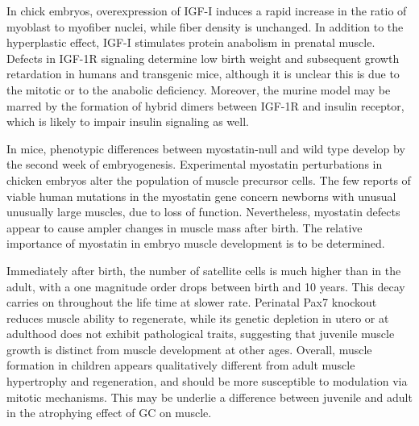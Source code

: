 \documentclass[12pt,english]{report}\usepackage[]{graphicx}\usepackage[]{color}
\begin{document}
In chick embryos, overexpression of IGF-I induces a rapid increase
in the ratio of myoblast to myofiber nuclei, while fiber density is
unchanged\citep{mitchell2002insulin-like}. In addition to the hyperplastic
effect, IGF-I stimulates protein anabolism in prenatal muscle\citep{shen2003protein}.
Defects in IGF-1R signaling determine low birth weight and subsequent
growth retardation in humans and transgenic mice, although it is unclear
this is due to the mitotic or to the anabolic deficiency\citep{fernandez2001functional,abuzzahab2003igf-i}.
Moreover, the murine model may be marred by the formation of hybrid
dimers between IGF-1R and insulin receptor, which is likely to impair
insulin signaling as well.

In mice, phenotypic differences between myostatin-null and wild type
develop by the second week of embryogenesis\citep{matsakas2010altered}.
Experimental myostatin perturbations in chicken embryos alter the
population of muscle precursor cells\citep{manceau2008myostatin}.
The few reports of viable human mutations in the myostatin gene concern
newborns with unusual unusually large muscles, due to loss of function\citep{schuelke2004myostatin}.
Nevertheless, myostatin defects appear to cause ampler changes in
muscle mass after birth\citep{lin2002myostatin,schuelke2004myostatin}.
The relative importance of myostatin in embryo muscle development
is to be determined.

Immediately after birth, the number of satellite cells is much higher
than in the adult, with a one magnitude order drops between birth
and 10 years\citep{verdijk2014satellite}. This decay carries on throughout
the life time at slower rate. Perinatal Pax7 knockout reduces muscle
ability to regenerate, while its genetic depletion in utero or at
adulthood does not exhibit pathological traits\citep{lepper2009adult},
suggesting that juvenile muscle growth is distinct from muscle development
at other ages. Overall, muscle formation in children appears qualitatively
different from adult muscle hypertrophy and regeneration, and should
be more susceptible to modulation via mitotic mechanisms. This may
be underlie a difference between juvenile and adult in the atrophying
effect of GC on muscle.
\end{document}
